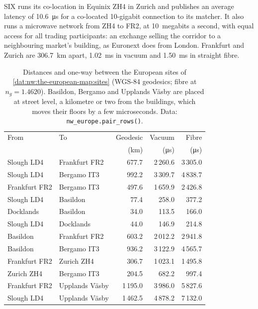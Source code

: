 SIX runs its co-location in Equinix ZH4 in Zurich and publishes an average latency of \qty{10.6}{\micro\second} for a co-located 10-gigabit
connection to its matcher. It also runs a microwave network from ZH4 to FR2, at 10~megabits a second, with equal access for all trading
participants: an exchange selling the corridor to a neighbouring market's building, as Euronext does from London. Frankfurt and Zurich are
\qty{306.7}{\kilo\metre} apart, \qty{1.02}{\milli\second} in vacuum and \qty{1.50}{\milli\second} in straight fibre.

\begin{table}[ht]
\centering\small
\begin{tabular}{llrrr}
\toprule
From & To & Geodesic & Vacuum & Fibre \\
 & & (km) & (\si{\micro\second}) & (\si{\micro\second}) \\
\midrule
Slough LD4 & Frankfurt FR2 & 677.7 & 2\,260.6 & 3\,305.0 \\
Slough LD4 & Bergamo IT3 & 992.2 & 3\,309.7 & 4\,838.7 \\
Frankfurt FR2 & Bergamo IT3 & 497.6 & 1\,659.9 & 2\,426.8 \\
Slough LD4 & Basildon & 77.4 & 258.0 & 377.2 \\
Docklands & Basildon & 34.0 & 113.5 & 166.0 \\
Slough LD4 & Docklands & 44.0 & 146.9 & 214.8 \\
Basildon & Frankfurt FR2 & 603.2 & 2\,012.2 & 2\,941.8 \\
Basildon & Bergamo IT3 & 936.2 & 3\,122.9 & 4\,565.7 \\
Frankfurt FR2 & Zurich ZH4 & 306.7 & 1\,023.1 & 1\,495.8 \\
Zurich ZH4 & Bergamo IT3 & 204.5 & 682.2 & 997.4 \\
Frankfurt FR2 & Upplands Väsby & 1\,195.0 & 3\,986.0 & 5\,827.6 \\
Slough LD4 & Upplands Väsby & 1\,462.5 & 4\,878.2 & 7\,132.0 \\
\bottomrule
\end{tabular}
\caption{Distances and one-way  between the European sites of \cref{dat:nw:the-european-map:sites} (WGS-84 geodesics; fibre
at $n_g = 1.4620$). Basildon, Bergamo and Upplands Väsby are placed at street level, a kilometre or two from the buildings, which moves their
floors by a few microseconds. Data: \texttt{nw\_europe.pair\_rows()}.}\label{tab:nw:the-european-map:pairs}
\end{table}

